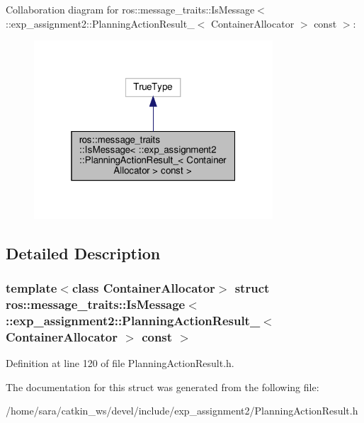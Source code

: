 Collaboration diagram for ros\+:\+:message\+\_\+traits\+:\+:Is\+Message$<$ \+:\+:exp\+\_\+assignment2\+:\+:Planning\+Action\+Result\+\_\+$<$ Container\+Allocator $>$ const $>$\+:
\nopagebreak
\begin{figure}[H]
\begin{center}
\leavevmode
\includegraphics[width=253pt]{structros_1_1message__traits_1_1IsMessage_3_01_1_1exp__assignment2_1_1PlanningActionResult___3_0425b1b2c792dce43d92bac2f30775ced}
\end{center}
\end{figure}


\subsection{Detailed Description}
\subsubsection*{template$<$class Container\+Allocator$>$\newline
struct ros\+::message\+\_\+traits\+::\+Is\+Message$<$ \+::exp\+\_\+assignment2\+::\+Planning\+Action\+Result\+\_\+$<$ Container\+Allocator $>$ const $>$}



Definition at line 120 of file Planning\+Action\+Result.\+h.



The documentation for this struct was generated from the following file\+:\begin{DoxyCompactItemize}
\item 
/home/sara/catkin\+\_\+ws/devel/include/exp\+\_\+assignment2/Planning\+Action\+Result.\+h\end{DoxyCompactItemize}
